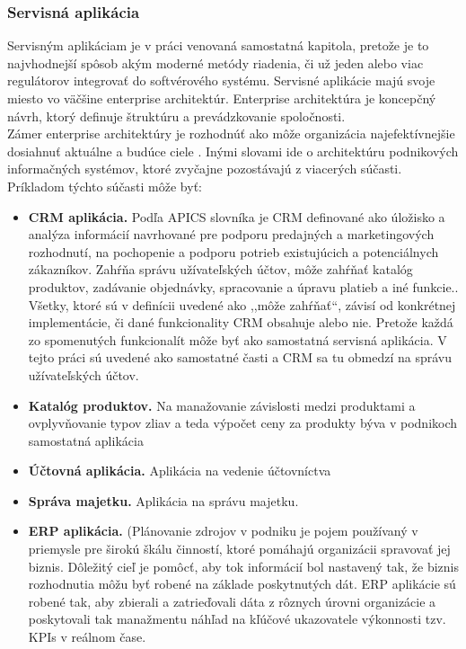 \subsubsection{Servisná aplikácia}
Servisným aplikáciam je v práci venovaná samostatná kapitola, pretože je to najvhodnejší spôsob akým moderné metódy riadenia, či už jeden alebo viac regulátorov integrovať do softvérového systému. Servisné aplikácie majú svoje miesto vo väčšine enterprise architektúr.  Enterprise architektúra je koncepčný návrh, ktorý definuje štruktúru a prevádzkovanie spoločnosti.\\ 
\indent Zámer enterprise architektúry je rozhodnúť ako môže organizácia najefektívnejšie dosiahnuť aktuálne a budúce ciele \cite{IOT09}. Inými slovami ide o  architektúru podnikových informačných systémov, ktoré zvyčajne pozostávajú z viacerých súčasti. Príkladom týchto súčasti môže byť:
\begin{itemize}
  \item  \textbf{CRM aplikácia.} Podľa APICS slovníka \cite{IOT10} je CRM definované ako úložisko a analýza informácií navrhované pre podporu predajných a marketingových rozhodnutí, na pochopenie a podporu potrieb existujúcich a potenciálnych zákazníkov. Zahŕňa správu užívateľských účtov, môže zahŕňať katalóg produktov, zadávanie objednávky, spracovanie a úpravu platieb a iné funkcie.\cite{IOT11}. Všetky, ktoré sú v definícii uvedené ako ,,môže zahŕňať``, závisí od konkrétnej implementácie, či dané funkcionality CRM obsahuje alebo nie. Pretože každá zo spomenutých funkcionalít môže byť ako samostatná servisná aplikácia. V tejto práci sú uvedené ako samostatné časti a CRM sa tu obmedzí na správu užívateľských účtov.
  \item  \textbf{Katalóg produktov.} Na manažovanie závislosti medzi produktami a ovplyvňovanie typov zliav a teda výpočet ceny za produkty býva v podnikoch samostatná aplikácia
 \item  \textbf{Účtovná aplikácia.} Aplikácia na vedenie účtovníctva
 \item  \textbf{Správa majetku.} Aplikácia na správu majetku. 
  \item  \textbf{ERP aplikácia.} (Plánovanie zdrojov v podniku je pojem používaný v priemysle pre širokú škálu činností, ktoré pomáhajú organizácii spravovať jej biznis. Dôležitý cieľ je pomôcť, aby tok informácií bol nastavený tak, že biznis rozhodnutia môžu byť robené na základe poskytnutých dát. ERP aplikácie sú robené tak, aby zbierali a zatrieďovali dáta z rôznych úrovni organizácie a poskytovali tak manažmentu náhľad na kľúčové ukazovatele výkonnosti tzv. KPIs v reálnom čase.\cite{IOT12} 
\end{itemize} 
